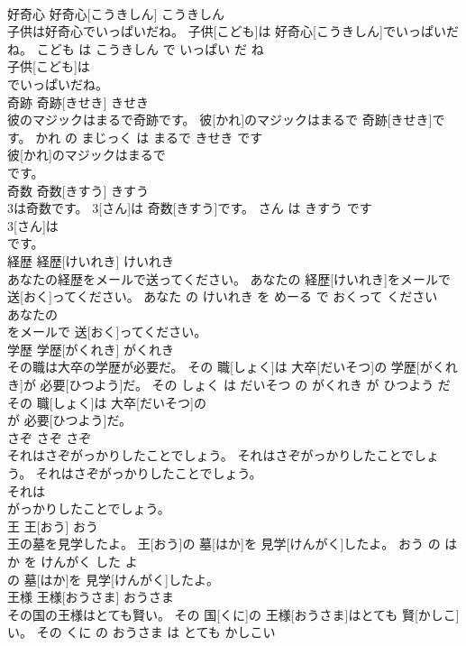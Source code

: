 \documentclass[8pt]{extreport}
\begin{document}
\begin{CJK}{UTF8}{min}
\\	好奇心	好奇心[こうきしん]	こうきしん	
\\	子供は好奇心でいっぱいだね。	子供[こども]は 好奇心[こうきしん]でいっぱいだね。	こども は こうきしん で いっぱい だ ね	
\\	子供[こども]は
\\	でいっぱいだね。			
\\	奇跡	奇跡[きせき]	きせき	
\\	彼のマジックはまるで奇跡です。	彼[かれ]のマジックはまるで 奇跡[きせき]です。	かれ の まじっく は まるで きせき です	
\\	彼[かれ]のマジックはまるで
\\	です。			
\\	奇数	奇数[きすう]	きすう	
\\	3は奇数です。	3[さん]は 奇数[きすう]です。	さん は きすう です	
\\	3[さん]は
\\	です。			
\\	経歴	経歴[けいれき]	けいれき	
\\	あなたの経歴をメールで送ってください。	あなたの 経歴[けいれき]をメールで 送[おく]ってください。	あなた の けいれき を めーる で おくって ください	
\\	あなたの
\\	をメールで 送[おく]ってください。			
\\	学歴	学歴[がくれき]	がくれき	
\\	その職は大卒の学歴が必要だ。	その 職[しょく]は 大卒[だいそつ]の 学歴[がくれき]が 必要[ひつよう]だ。	その しょく は だいそつ の がくれき が ひつよう だ	
\\	その 職[しょく]は 大卒[だいそつ]の
\\	が 必要[ひつよう]だ。			
\\	さぞ	さぞ	さぞ	
\\	それはさぞがっかりしたことでしょう。	それはさぞがっかりしたことでしょう。	それはさぞがっかりしたことでしょう。	
\\	それは
\\	がっかりしたことでしょう。			
\\	王	王[おう]	おう	
\\	王の墓を見学したよ。	王[おう]の 墓[はか]を 見学[けんがく]したよ。	おう の はか を けんがく した よ	
\\	の 墓[はか]を 見学[けんがく]したよ。			
\\	王様	王様[おうさま]	おうさま	
\\	その国の王様はとても賢い。	その 国[くに]の 王様[おうさま]はとても 賢[かしこ]い。	その くに の おうさま は とても かしこい	

\end{CJK}
\end{document}
